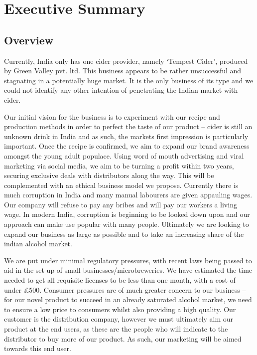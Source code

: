 \documentclass[11pt]{article}
\begin{document}
\newpage
\tableofcontents
\newpage


\section{Executive Summary}
\subsection{Overview}

Currently, India only has one cider provider, namely `Tempest Cider', produced
by Green Valley pvt. ltd. This business appears to be rather unsuccessful and
stagnating in a potentially huge market. It is the only business of its type and
we could not identify any other intention of penetrating the Indian market with
cider.

Our initial vision for the business is to experiment with our recipe and
production methods in order to perfect the taste of our product -- cider is
still an unknown drink in India and as such, the markets first impression is
particularly important. Once the recipe is confirmed, we aim to expand our brand
awareness amongst the young adult populace. Using word of mouth advertising and
viral marketing via social media, we aim to be turning a profit within two
years, securing exclusive deals with distributors along the way. This will be
complemented with an ethical business model we propose. Currently there is
much corruption in India and many manual labourers are given appauling wages.
Our company will refuse to pay any bribes and will pay our workers a living
wage. In modern India, corruption is beginning to be looked down upon and our
approach can make use popular with many people. Ultimately we are looking to
expand our business as large as possible and to take an increasing share of the
indian alcohol market.

We are put under minimal regulatory pressures, with recent laws being passed
to aid in the set up of small businesses/microbreweries. We have estimated
the time needed to get all requisite licenses to be less than one month,
with a cost of under \pounds 500. Consumer pressures are of much greater concern
to our business -- for our novel product to succeed in an already saturated
alcohol market, we need to ensure a low price to consumers whilst also
providing a high quality. Our customer is the distribution company, however
we must ultimately aim our product at the end users, as these are the people
who will indicate to the distributor to buy more of our product. As such, our
marketing will be aimed towards this end user.
\end{document}
